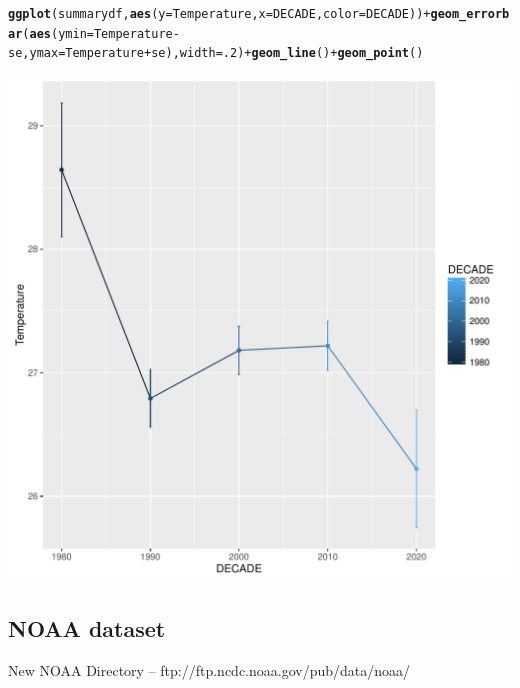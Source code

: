 \documentclass{article}\usepackage[]{graphicx}\usepackage[]{color}
\makeatletter
\def\maxwidth{ %
  \ifdim\Gin@nat@width>\linewidth
    \linewidth
  \else
    \Gin@nat@width
  \fi
}
\newcommand{\hlnum}[1]{\textcolor[rgb]{0.686,0.059,0.569}{#1}}%
\newcommand{\hlopt}[1]{\textcolor[rgb]{0,0,0}{#1}}%
\newcommand{\hlstd}[1]{\textcolor[rgb]{0.345,0.345,0.345}{#1}}%
\newcommand{\hlkwc}[1]{\textcolor[rgb]{0.333,0.667,0.333}{#1}}%
\newcommand{\hlkwd}[1]{\textcolor[rgb]{0.737,0.353,0.396}{\textbf{#1}}}%
\newenvironment{kframe}{%
 \def\at@end@of@kframe{}%
 \ifinner\ifhmode%
  \def\at@end@of@kframe{\end{minipage}}%
  \begin{minipage}{\columnwidth}%
 \fi\fi%
 \def\FrameCommand##1{\hskip\@totalleftmargin \hskip-\fboxsep
 \colorbox{shadecolor}{##1}\hskip-\fboxsep
     \hskip-\linewidth \hskip-\@totalleftmargin \hskip\columnwidth}%
 \MakeFramed {\advance\hsize-\width
   \@totalleftmargin\z@ \linewidth\hsize
   \@setminipage}}%
 {\par\unskip\endMakeFramed%
 \at@end@of@kframe}
\newenvironment{knitrout}{}{} %
\makeatother
\begin{document}
\begin{knitrout}
\begin{kframe}
\begin{alltt}
\hlkwd{ggplot}\hlstd{(summarydf,} \hlkwd{aes}\hlstd{(}\hlkwc{y}\hlstd{=Temperature,} \hlkwc{x}\hlstd{=DECADE,} \hlkwc{color}\hlstd{= DECADE))} \hlopt{+} \hlkwd{geom_errorbar}\hlstd{(}\hlkwd{aes}\hlstd{(}\hlkwc{ymin}\hlstd{=Temperature}\hlopt{-}\hlstd{se,} \hlkwc{ymax}\hlstd{=Temperature}\hlopt{+}\hlstd{se),} \hlkwc{width}\hlstd{=}\hlnum{.2}\hlstd{)} \hlopt{+} \hlkwd{geom_line}\hlstd{()} \hlopt{+} \hlkwd{geom_point}\hlstd{()}
\end{alltt}
\end{kframe}
\includegraphics[width=\maxwidth]{figure/unnamed-chunk-7-1} 

\end{knitrout}




\subsection{NOAA dataset}

New NOAA Directory -- ftp://ftp.ncdc.noaa.gov/pub/data/noaa/
\end{document}
